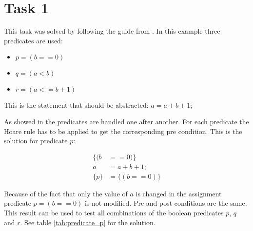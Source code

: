 \chapter{Task 1}
\label{cha:task1}
This task was solved by following the guide from \parencite{Koenighofer:2012:Online}. In this example three predicates are used:
\begin{itemize}
\item $p = (b == 0)$
\item $q = (a < b)$
\item $r = (a <= b + 1)$
\end{itemize}
This is the statement that should be abstracted: $a = a + b + 1;$

As showed in \parencite{Koenighofer:2012:Online} the predicates are handled one after another. For each predicate the Hoare rule has to be applied to get the corresponding pre condition. This is the solution for predicate $p$:

\begin{equation}
\begin{array}{rl}
\{ (b &== 0) \}\\
a &= a + b + 1;\\
\{p\} &= \{ (b == 0) \}
\end{array}
\end{equation}

Because of the fact that only the value of $a$ is changed in the assignment predicate $p = (b == 0)$ is not modified. Pre and post conditions are the same. This result can be used to test all combinations of the boolean predicates $p$, $q$ and $r$. See table \ref{tab:predicate_p} for the solution.

